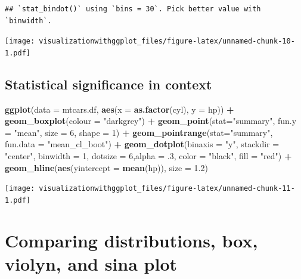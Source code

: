 \documentclass[]{krantz}
\makeatletter
\newenvironment{Shaded}{\begin{snugshade}}{\end{snugshade}}
\newcommand{\DataTypeTok}[1]{\textcolor[rgb]{0.13,0.29,0.53}{#1}}
\newcommand{\DecValTok}[1]{\textcolor[rgb]{0.00,0.00,0.81}{#1}}
\newcommand{\FloatTok}[1]{\textcolor[rgb]{0.00,0.00,0.81}{#1}}
\newcommand{\KeywordTok}[1]{\textcolor[rgb]{0.13,0.29,0.53}{\textbf{#1}}}
\newcommand{\NormalTok}[1]{#1}
\newcommand{\OperatorTok}[1]{\textcolor[rgb]{0.81,0.36,0.00}{\textbf{#1}}}
\newcommand{\StringTok}[1]{\textcolor[rgb]{0.31,0.60,0.02}{#1}}
\newenvironment{kframe}{%
\medskip{}
\setlength{\fboxsep}{.8em}
 \def\at@end@of@kframe{}%
 \ifinner\ifhmode%
  \def\at@end@of@kframe{\end{minipage}}%
  \begin{minipage}{\columnwidth}%
 \fi\fi%
 \def\FrameCommand##1{\hskip\@totalleftmargin \hskip-\fboxsep
 \colorbox{shadecolor}{##1}\hskip-\fboxsep
     \hskip-\linewidth \hskip-\@totalleftmargin \hskip\columnwidth}%
 \MakeFramed {\advance\hsize-\width
   \@totalleftmargin\z@ \linewidth\hsize
   \@setminipage}}%
 {\par\unskip\endMakeFramed%
 \at@end@of@kframe}
\renewenvironment{Shaded}{\begin{kframe}}{\end{kframe}}
\makeatother
\begin{document}
\begin{verbatim}
## `stat_bindot()` using `bins = 30`. Pick better value with `binwidth`.
\end{verbatim}

\texttt{[image: visualizationwithggplot\_files/figure-latex/unnamed-chunk-10-1.pdf]}

\hypertarget{statistical-significance-in-context}{%
\subsection{Statistical significance in context}\label{statistical-significance-in-context}}

\begin{Shaded}
\begin{Highlighting}[]
\KeywordTok{ggplot}\NormalTok{(}\DataTypeTok{data =}\NormalTok{ mtcars.df, }\KeywordTok{aes}\NormalTok{(}\DataTypeTok{x =} \KeywordTok{as.factor}\NormalTok{(cyl), }\DataTypeTok{y =}\NormalTok{ hp)) }\OperatorTok{+}\StringTok{ }
\StringTok{  }\KeywordTok{geom_boxplot}\NormalTok{(}\DataTypeTok{colour =} \StringTok{"darkgrey"}\NormalTok{) }\OperatorTok{+}\StringTok{ }
\StringTok{  }\KeywordTok{geom_point}\NormalTok{(}\DataTypeTok{stat=}\StringTok{"summary"}\NormalTok{, }\DataTypeTok{fun.y =} \StringTok{"mean"}\NormalTok{, }\DataTypeTok{size =} \DecValTok{6}\NormalTok{, }\DataTypeTok{shape =} \DecValTok{1}\NormalTok{) }\OperatorTok{+}
\StringTok{  }\KeywordTok{geom_pointrange}\NormalTok{(}\DataTypeTok{stat=}\StringTok{"summary"}\NormalTok{, }\DataTypeTok{fun.data =} \StringTok{"mean_cl_boot"}\NormalTok{) }\OperatorTok{+}
\StringTok{  }\KeywordTok{geom_dotplot}\NormalTok{(}\DataTypeTok{binaxis =} \StringTok{"y"}\NormalTok{, }\DataTypeTok{stackdir =} \StringTok{"center"}\NormalTok{, }\DataTypeTok{binwidth =} \DecValTok{1}\NormalTok{, }
               \DataTypeTok{dotsize =} \DecValTok{6}\NormalTok{,}\DataTypeTok{alpha =} \FloatTok{.3}\NormalTok{, }\DataTypeTok{color =} \StringTok{"black"}\NormalTok{, }\DataTypeTok{fill =} \StringTok{"red"}\NormalTok{) }\OperatorTok{+}
\StringTok{  }\KeywordTok{geom_hline}\NormalTok{(}\KeywordTok{aes}\NormalTok{(}\DataTypeTok{yintercept =} \KeywordTok{mean}\NormalTok{(hp)), }\DataTypeTok{size =} \FloatTok{1.2}\NormalTok{) }
\end{Highlighting}
\end{Shaded}

\texttt{[image: visualizationwithggplot\_files/figure-latex/unnamed-chunk-11-1.pdf]}

\hypertarget{comparing-distributions-box-violyn-and-sina-plot}{%
\section{Comparing distributions, box, violyn, and sina plot}\label{comparing-distributions-box-violyn-and-sina-plot}}
\end{document}
